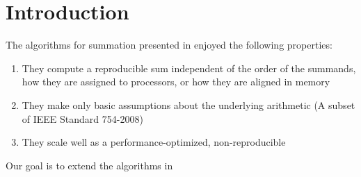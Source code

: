 \section{Introduction}
  The algorithms for summation presented in \cite{repsum} enjoyed the following properties:
  \begin{enumerate}
    \item They compute a reproducible sum independent of the order of the summands, how they are assigned to processors, or how they are aligned in memory
    \item They make only basic assumptions about the underlying arithmetic (A subset of IEEE Standard 754-2008)
    \item They scale well as a performance-optimized, non-reproducible
  \end{enumerate}
  Our goal is to extend the algorithms in \cite{repsum}
